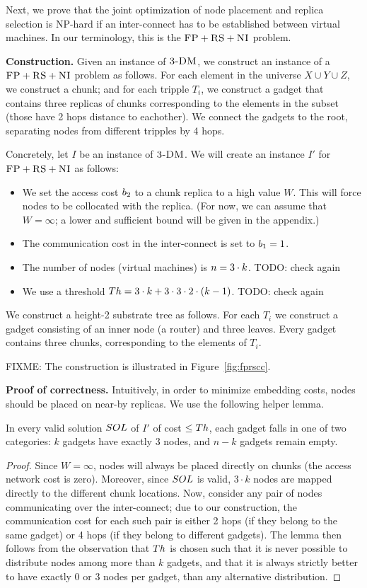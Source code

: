 Next, we prove that the joint optimization of node placement and replica selection
is NP-hard if an inter-connect has to be established between virtual machines.
In our terminology, this is the $\textsc{FP}+\textsc{RS}+\textsc{NI}$ problem.


\textbf{Construction.}
Given an instance of $\textsc{3-DM}$, we construct an instance of a
$\textsc{FP}+\textsc{RS}+\textsc{NI}$ problem as follows. For each element
in the universe $X \cup Y \cup Z$, we construct a chunk; and for each
tripple $T_i$, we construct a gadget that contains
three replicas of chunks corresponding to the elements in the subset (those have 2 hops distance to eachother).
We connect the gadgets to the root, separating nodes from different tripples by 4 hops.

Concretely, let $I$ be an instance of $\textsc{3-DM}$. We will create an instance $I'$
for $\textsc{FP}+\textsc{RS}+\textsc{NI}$ as follows:
\begin{itemize}
\item We set the access cost $b_2$ to a chunk replica to a high value $W$. This will force
nodes to be collocated with the replica.
(For now, we can assume that $W=\infty$; a lower and sufficient bound will be given
in the appendix.)
\item The communication cost in the inter-connect is set to $b_1 = 1$.
\item The number of nodes (virtual machines) is $n = 3 \cdot k$. TODO: check again
\item We use a threshold $Th =  3 \cdot k + 3 \cdot 3 \cdot 2 \cdot (k - 1)$. TODO: check again
\end{itemize}

We construct a height-2 substrate tree
as follows. For each $T_i$ we construct a gadget
consisting of an inner node (a router) and three leaves. Every gadget
contains three chunks, corresponding to the elements of $T_i$.

FIXME: The construction is illustrated in Figure~\ref{fig:fprscc}.

\textbf{Proof of correctness.}
Intuitively, in order to minimize embedding costs,
nodes should be placed on near-by replicas. We use the following
helper lemma.
\begin{lemma}\label{lemma:helper}
In every valid solution $SOL$ of $I'$ of cost $\leq Th$, each gadget
falls in one of two categories:
$k$ gadgets have exactly
$3$ nodes, and $n-k$ gadgets remain empty.
\end{lemma}
\begin{proof}
Since $W=\infty$, nodes will always be placed
directly on chunks (the access network cost is zero).
Moreover, since
$SOL$ is valid, $3 \cdot k$ nodes are mapped
directly to the different chunk locations.
Now, consider any pair of nodes communicating over the
inter-connect; due to our construction, the communication cost
for each such pair is either
2 hops (if they belong to the same gadget) or 4 hops (if they belong
to different gadgets).
The lemma then follows from the observation that $Th$
is chosen such that it is never possible to distribute nodes
among more than $k$ gadgets, and that it is always strictly better to
have exactly 0 or 3 nodes per gadget, than any alternative distribution.
\end{proof}

